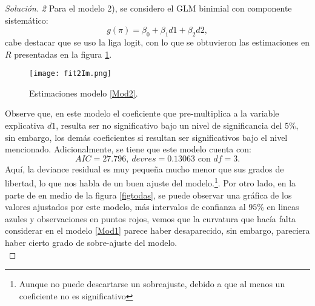 \documentclass[10.5pt,notitlepage]{article}
\newenvironment{solucion}
  {\begin{proof}[Solución]}
  {\end{proof}}
\theoremstyle{plain}
\begin{document}
\begin{solucion}
\textit{2} Para el modelo 2), se considero el GLM binimial con componente sistemático:
\begin{equation}\label{Mod2}
    g(\pi) = \beta_0 + \beta_{1}d1+\beta_2 d2,
\end{equation}
cabe destacar que se uso la liga logit, con lo que se obtuvieron las estimaciones en \(R\) presentadas en la figura \ref{fig2}.
\begin{figure}[htb]
    \centering
    \texttt{[image: fit2Im.png]}
    \caption{Estimaciones modelo \eqref{Mod2}.}
    \label{fig2}
\end{figure}
Observe que, en este modelo el coeficiente que pre-multiplica a la variable explicativa \(d1\), resulta ser no significativo bajo un nivel de significancia del \(5\%\), sin embargo, los demás coeficientes si resultan ser significativos bajo el nivel mencionado. Adicionalmente, se tiene que este modelo cuenta con: 
\begin{equation}\label{AIC2}
    AIC = 27.796, \ devres = 0.13063 \text{ con } df = 3.  
\end{equation}
Aquí, la deviance residual es muy pequeña mucho menor que sus grados de libertad, lo que nos habla de un buen ajuste del modelo.\footnote{Aunque no puede descartarse un sobreajuste, debido a que al menos un coeficiente no es significativo}. Por otro lado, en la parte de en medio de la figura \ref{figtodas}, se puede observar una gráfica de los valores ajustados por este modelo, más intervalos de confianza al \(95\%\) en lineas azules y observaciones en puntos rojos, vemos que la curvatura que hacía falta considerar en el modelo \eqref{Mod1} parece haber desaparecido, sin embargo, pareciera haber cierto grado de sobre-ajuste del modelo. \\ 


\end{solucion}
\end{document}
